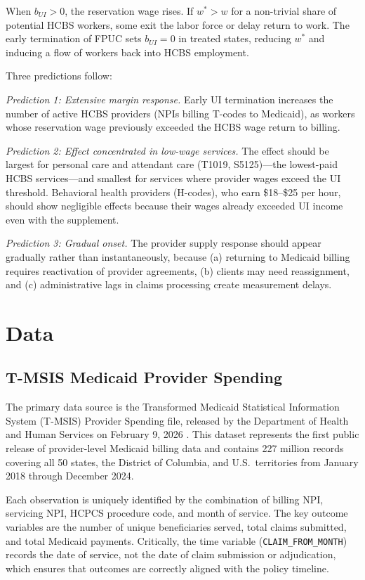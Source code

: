 \documentclass[12pt]{article}
\begin{document}
When $b_{UI} > 0$, the reservation wage rises. If $w^* > w$ for a non-trivial share of potential HCBS workers, some exit the labor force or delay return to work. The early termination of FPUC sets $b_{UI} = 0$ in treated states, reducing $w^*$ and inducing a flow of workers back into HCBS employment.

Three predictions follow:

\textit{Prediction 1: Extensive margin response.} Early UI termination increases the number of active HCBS providers (NPIs billing T-codes to Medicaid), as workers whose reservation wage previously exceeded the HCBS wage return to billing.

\textit{Prediction 2: Effect concentrated in low-wage services.} The effect should be largest for personal care and attendant care (T1019, S5125)---the lowest-paid HCBS services---and smallest for services where provider wages exceed the UI threshold. Behavioral health providers (H-codes), who earn \$18--\$25 per hour, should show negligible effects because their wages already exceeded UI income even with the supplement.

\textit{Prediction 3: Gradual onset.} The provider supply response should appear gradually rather than instantaneously, because (a) returning to Medicaid billing requires reactivation of provider agreements, (b) clients may need reassignment, and (c) administrative lags in claims processing create measurement delays.


\section{Data}

\subsection{T-MSIS Medicaid Provider Spending}

The primary data source is the Transformed Medicaid Statistical Information System (T-MSIS) Provider Spending file, released by the Department of Health and Human Services on February 9, 2026 \citep{hhs2026}. This dataset represents the first public release of provider-level Medicaid billing data and contains 227 million records covering all 50 states, the District of Columbia, and U.S.\ territories from January 2018 through December 2024.

Each observation is uniquely identified by the combination of billing NPI, servicing NPI, HCPCS procedure code, and month of service. The key outcome variables are the number of unique beneficiaries served, total claims submitted, and total Medicaid payments. Critically, the time variable (\texttt{CLAIM\_FROM\_MONTH}) records the date of service, not the date of claim submission or adjudication, which ensures that outcomes are correctly aligned with the policy timeline.
\end{document}
